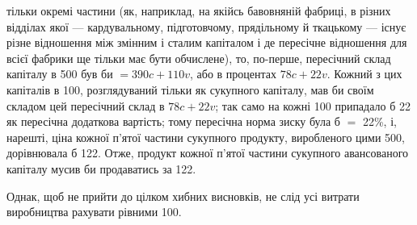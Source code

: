 \parcont{}  %
тільки окремі частини (як, наприклад, на якійсь бавовняній фабриці, в різних відділах якої —
кардувальному, підготовчому, прядільному й ткацькому — існує різне відношення між змінним і
сталим капіталом і де пересічне відношення для всієї фабрики
ще тільки має бути обчислене), то, по-перше, пересічний склад
капіталу в 500 був би $= 390 c + 110 v$, або в процентах $78 c + 22 v$.
Кожний з цих капіталів в 100, розглядуваний тільки як  сукупного капіталу, мав би своїм складом цей
пересічний склад
в $78 c + 22 v$; так само на кожні 100 припадало б 22 як пересічна
додаткова вартість; тому пересічна норма зиску була б $=$ 22\%,
і, нарешті, ціна кожної п’ятої частини сукупного продукту, виробленого цими 500, дорівнювала б 122.
Отже, продукт кожної
п’ятої частини сукупного авансованого капіталу мусив би продаватись за 122.

Однак, щоб не прийти до цілком хибних висновків, не слід
усі витрати виробництва рахувати рівними 100.

